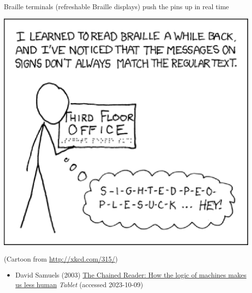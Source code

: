 \documentclass[a4paper,landscape,headrule,footrule,xetex]{foils}
\begin{document}
Braille terminals (refreshable Braille displays) push the pins up in
real time


\includegraphics{../pics/braille-xkcd.eps}

(Cartoon from \url{http://xkcd.com/315/})



\begin{itemize}
\item David Samuels (2003)
  \href{https://www.tabletmag.com/sections/arts-letters/articles/chained-reader-david-samuels}{The
    Chained Reader: How the logic of machines makes us less human}
  \textit{Tablet} (accessed 2023-10-09)
\end{itemize}



\end{document}
